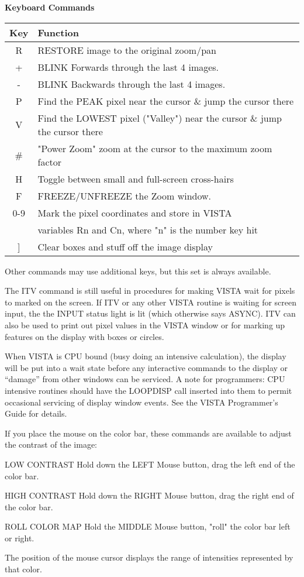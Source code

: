 \begin{center}
{\bf Keyboard Commands}\\
\begin{tabular}{cl}
\hline
Key & Function\\
\hline
 R &RESTORE image to the original zoom/pan\\
 + &BLINK Forwards through the last 4 images.\\
 - &BLINK Backwards through the last 4 images.\\
 P &Find the PEAK pixel near the cursor \& jump the cursor there\\
 V &Find the LOWEST pixel ("Valley") near the cursor \& jump the cursor there\\
 \# &"Power Zoom" zoom at the cursor to the maximum zoom factor\\
 H &Toggle between small and full-screen cross-hairs\\
 F &FREEZE/UNFREEZE the Zoom window.\\
0-9&Mark the pixel coordinates and store in VISTA\\
   &variables Rn and Cn, where "n" is the number key hit\\
 ] &Clear boxes and stuff off the image display\\
\hline
\end{tabular}
\end{center}

Other commands may use additional keys, but this set is always available.

The ITV command is still useful in procedures for making VISTA wait for
pixels to marked on the screen.  If ITV or any other VISTA routine is
waiting for screen input, the the INPUT status light is lit (which
otherwise says ASYNC).  ITV can also be used to print out pixel values in
the VISTA window or for marking up features on the display with boxes or
circles.

When VISTA is CPU bound (busy doing an intensive calculation), the display
will be put into a wait state before any interactive commands to the
display or ``damage'' from other windows can be serviced.  A note for
programmers: CPU intensive routines should have the LOOPDISP call inserted
into them to permit occasional servicing of display window events.  See the
VISTA Programmer's Guide for details.


If you place the mouse on the color bar, these commands are available
to adjust the contrast of the image:
\begin{example}
  \item[LOW CONTRAST]{Hold down the LEFT Mouse button, drag the left
       end of the color bar.}

  \item[HIGH CONTRAST]{Hold down the RIGHT Mouse button, drag the right
       end of the color bar.}

  \item[ROLL COLOR MAP]{Hold the MIDDLE Mouse button, "roll" the
       color bar left or right.}
\end{example} 
The position of the mouse cursor displays the range of intensities
represented by that color.
 
